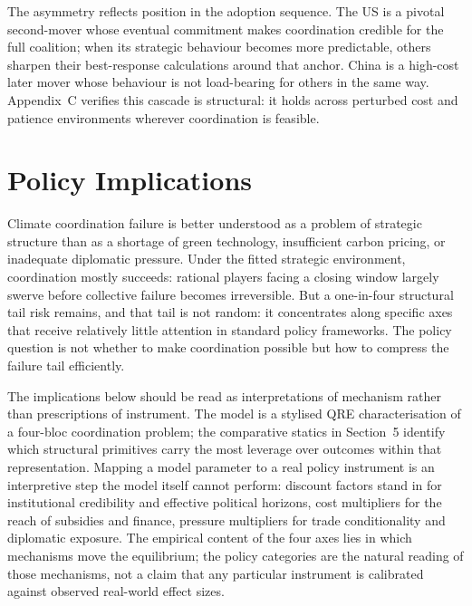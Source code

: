 \documentclass[10pt,a4paper]{article}
\begin{document}
The asymmetry reflects position in the adoption sequence. The US is a pivotal second-mover whose eventual commitment makes coordination credible for the full coalition; when its strategic behaviour becomes more predictable, others sharpen their best-response calculations around that anchor. China is a high-cost later mover whose behaviour is not load-bearing for others in the same way. Appendix~C verifies this cascade is structural: it holds across perturbed cost and patience environments wherever coordination is feasible.

\clearpage
\needspace{12em}
\section{Policy Implications}

Climate coordination failure is better understood as a problem of strategic structure than as a shortage of green technology, insufficient carbon pricing, or inadequate diplomatic pressure. Under the fitted strategic environment, coordination mostly succeeds: rational players facing a closing window largely swerve before collective failure becomes irreversible. But a one-in-four structural tail risk remains, and that tail is not random: it concentrates along specific axes that receive relatively little attention in standard policy frameworks. The policy question is not whether to make coordination possible but how to compress the failure tail efficiently.

The implications below should be read as interpretations of mechanism rather than prescriptions of instrument. The model is a stylised QRE characterisation of a four-bloc coordination problem; the comparative statics in Section~5 identify which structural primitives carry the most leverage over outcomes within that representation. Mapping a model parameter to a real policy instrument is an interpretive step the model itself cannot perform: discount factors stand in for institutional credibility and effective political horizons, cost multipliers for the reach of subsidies and finance, pressure multipliers for trade conditionality and diplomatic exposure. The empirical content of the four axes lies in which mechanisms move the equilibrium; the policy categories are the natural reading of those mechanisms, not a claim that any particular instrument is calibrated against observed real-world effect sizes.
\end{document}
